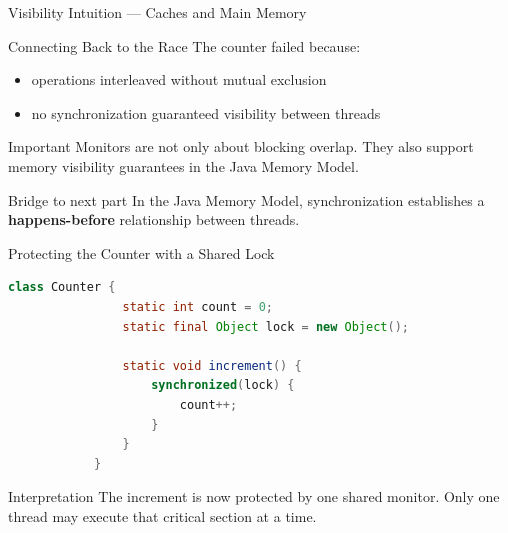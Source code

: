 \documentclass[aspectratio=169,11pt]{beamer}
\begin{document}
\begin{frame}{Visibility Intuition --- Caches and Main Memory}
	\end{frame}
	\begin{frame}{Connecting Back to the Race}
		The counter failed because:
		\begin{itemize}
			\item operations interleaved without mutual exclusion
			\item no synchronization guaranteed visibility between threads
		\end{itemize}
		
		\bigskip
		\begin{block}{Important}
			Monitors are not only about blocking overlap.
			They also support memory visibility guarantees in the Java Memory Model.
		\end{block}
		
		\bigskip
		\begin{alertblock}{Bridge to next part}
			In the Java Memory Model, synchronization establishes
			a \textbf{happens-before} relationship between threads.
		\end{alertblock}
	\end{frame}
	
	\begin{frame}[fragile]{Protecting the Counter with a Shared Lock}
		\begin{lstlisting}[language=Java]
			class Counter {
				static int count = 0;
				static final Object lock = new Object();
				
				static void increment() {
					synchronized(lock) {
						count++;
					}
				}
			}
		\end{lstlisting}
		
		\vspace{0.2cm}
		\begin{block}{Interpretation}
			The increment is now protected by one shared monitor.
			Only one thread may execute that critical section at a time.
		\end{block}
	\end{frame}
	
\end{document}
